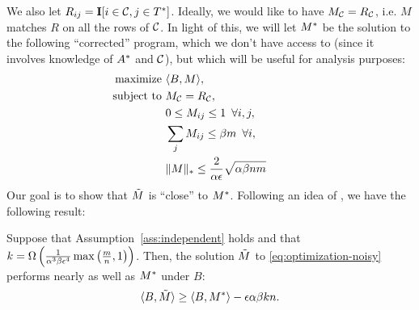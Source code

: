 We also let $R_{ij} = \mathbf{I}[i \in \mathcal{C}, j \in T^*]$.
Ideally, we would like to have $M_{\mathcal{C}} = R_{\mathcal{C}}$, i.e. $M$ matches $R$ on 
all the rows of $\mathcal{C}$. In light of this, 
we will let $M^*$ be the solution to the following ``corrected'' program, which 
we don't have access to (since it involves knowledge of $A^*$ and $\mathcal{C}$), 
but which will be useful for analysis purposes:
\begin{align}
\label{eq:optimization-noiseless}
\text{maximize } &\langle B, M \rangle, \\
\notag \text{ subject to } &M_{\mathcal{C}} = R_{\mathcal{C}}, \\
\notag  &0 \leq M_{ij} \leq 1 \,\,\, \forall i,j,  \\
\notag  &\sum_j M_{ij} \leq \beta m \,\,\, \forall i, \\
\notag  &\|M\|_* \leq \frac{2}{\alpha\epsilon}\sqrt{\alpha\beta nm} \phantom{xxxxxxx}
\end{align}
Our goal is to show that $\tilde{M}$ is ``close'' to $M^*$. 
Following an idea of \citet{guedon2014community}, we have the following result:
\begin{lemma}
\label{lem:objective-bound}
Suppose that Assumption~\ref{ass:independent} holds and that 
$k = \Omega\left( \frac{1}{\alpha^3\beta\epsilon^4}\max\left( \frac{m}{n},1 \right) \right)$. 
Then, the solution $\tilde{M}$ to \eqref{eq:optimization-noisy} performs nearly as 
well as $M^*$ under $B$:
\begin{equation}
\label{eq:objective-bound}
\langle B, \tilde{M} \rangle \geq \langle B, M^* \rangle - \epsilon \alpha\beta kn.
\end{equation}
\end{lemma}
